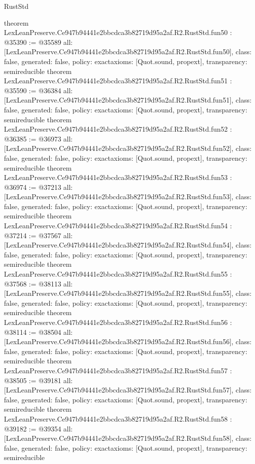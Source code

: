 \begin{lexlean}{RustStd}
\begin{coremodule}
{}
theorem LexLeanPreserve.Ce947b94441e2bbcdca3b82719d95a2af.R2.RustStd.fun50 : @35390 := @35589 {
  all: [LexLeanPreserve.Ce947b94441e2bbcdca3b82719d95a2af.R2.RustStd.fun50],
  class: false,
  generated: false,
  policy: exact{axioms: [Quot.sound, propext]},
  transparency: semireducible
}
theorem LexLeanPreserve.Ce947b94441e2bbcdca3b82719d95a2af.R2.RustStd.fun51 : @35590 := @36384 {
  all: [LexLeanPreserve.Ce947b94441e2bbcdca3b82719d95a2af.R2.RustStd.fun51],
  class: false,
  generated: false,
  policy: exact{axioms: [Quot.sound, propext]},
  transparency: semireducible
}
theorem LexLeanPreserve.Ce947b94441e2bbcdca3b82719d95a2af.R2.RustStd.fun52 : @36385 := @36973 {
  all: [LexLeanPreserve.Ce947b94441e2bbcdca3b82719d95a2af.R2.RustStd.fun52],
  class: false,
  generated: false,
  policy: exact{axioms: [Quot.sound, propext]},
  transparency: semireducible
}
theorem LexLeanPreserve.Ce947b94441e2bbcdca3b82719d95a2af.R2.RustStd.fun53 : @36974 := @37213 {
  all: [LexLeanPreserve.Ce947b94441e2bbcdca3b82719d95a2af.R2.RustStd.fun53],
  class: false,
  generated: false,
  policy: exact{axioms: [Quot.sound, propext]},
  transparency: semireducible
}
theorem LexLeanPreserve.Ce947b94441e2bbcdca3b82719d95a2af.R2.RustStd.fun54 : @37214 := @37567 {
  all: [LexLeanPreserve.Ce947b94441e2bbcdca3b82719d95a2af.R2.RustStd.fun54],
  class: false,
  generated: false,
  policy: exact{axioms: [Quot.sound, propext]},
  transparency: semireducible
}
theorem LexLeanPreserve.Ce947b94441e2bbcdca3b82719d95a2af.R2.RustStd.fun55 : @37568 := @38113 {
  all: [LexLeanPreserve.Ce947b94441e2bbcdca3b82719d95a2af.R2.RustStd.fun55],
  class: false,
  generated: false,
  policy: exact{axioms: [Quot.sound, propext]},
  transparency: semireducible
}
theorem LexLeanPreserve.Ce947b94441e2bbcdca3b82719d95a2af.R2.RustStd.fun56 : @38114 := @38504 {
  all: [LexLeanPreserve.Ce947b94441e2bbcdca3b82719d95a2af.R2.RustStd.fun56],
  class: false,
  generated: false,
  policy: exact{axioms: [Quot.sound, propext]},
  transparency: semireducible
}
theorem LexLeanPreserve.Ce947b94441e2bbcdca3b82719d95a2af.R2.RustStd.fun57 : @38505 := @39181 {
  all: [LexLeanPreserve.Ce947b94441e2bbcdca3b82719d95a2af.R2.RustStd.fun57],
  class: false,
  generated: false,
  policy: exact{axioms: [Quot.sound, propext]},
  transparency: semireducible
}
theorem LexLeanPreserve.Ce947b94441e2bbcdca3b82719d95a2af.R2.RustStd.fun58 : @39182 := @39354 {
  all: [LexLeanPreserve.Ce947b94441e2bbcdca3b82719d95a2af.R2.RustStd.fun58],
  class: false,
  generated: false,
  policy: exact{axioms: [Quot.sound, propext]},
  transparency: semireducible
}
\end{coremodule}
\end{lexlean}
